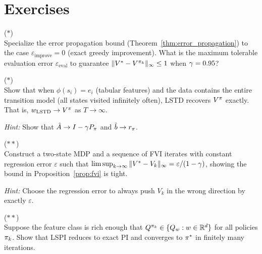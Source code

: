 \documentclass[11pt,a4paper]{article}
\begin{document}
\section{Exercises}
\label{sec:exercises}

\begin{exercise}
\textnormal{(\(*\))} \\
Specialize the error propagation bound
(Theorem~\ref{thm:error_propagation}) to the case
$\varepsilon_{\mathrm{improve}} = 0$ (exact greedy improvement).
What is the maximum tolerable evaluation error
$\varepsilon_{\mathrm{eval}}$ to guarantee
$\|V^* - V^{\pi_k}\|_\infty \leq 1$ when $\gamma = 0.95$?
\end{exercise}

\begin{exercise}
\textnormal{(\(*\))} \\
Show that when $\phi(s_i) = e_i$ (tabular features) and the data
contains the entire transition model (all states visited
infinitely often), LSTD recovers $V^\pi$ exactly. That is,
$w_{\mathrm{LSTD}} \to V^\pi$ as $T \to \infty$.

\textit{Hint:} Show that $\hat{A} \to I - \gamma P_\pi$ and
$\hat{b} \to r_\pi$.
\end{exercise}

\begin{exercise}
\textnormal{(\(**\))} \\
Construct a two-state MDP and a sequence of FVI iterates with constant
regression error $\varepsilon$ such that
$\limsup_{k \to \infty} \|V^* - V_k\|_\infty
= \varepsilon/(1-\gamma)$, showing the bound in
Proposition~\ref{prop:fvi} is tight.

\textit{Hint:} Choose the regression error to always push $V_k$ in the
wrong direction by exactly $\varepsilon$.
\end{exercise}

\begin{exercise}
\textnormal{(\(**\))} \\
Suppose the feature class is rich enough that
$Q^{\pi_k} \in \{Q_w : w \in \mathbb{R}^d\}$ for all policies
$\pi_k$. Show that LSPI reduces to exact PI and converges
to $\pi^*$ in finitely many iterations.
\end{exercise}
\end{document}
